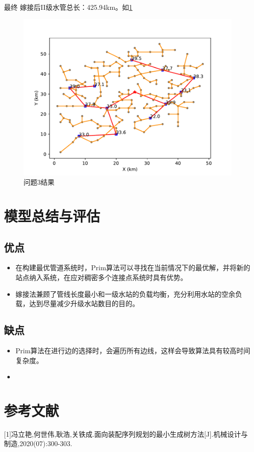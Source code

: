 \documentclass{cumcmthesis}
\begin{document}
最终
嫁接后II级水管总长：425.94km。如\cref{fig:pipline_graft_cut_9}
\begin{figure}[!h]
  \centering
  \includegraphics[width=.9\textwidth]{figure/pipline_graft_cut_9.pdf}
  \caption{问题3结果}
  \label{fig:pipline_graft_cut_9}
\end{figure}

\newpage

\section{模型总结与评估}
\subsection{优点}
\begin{itemize}
\item 在构建最优管道系统时，Prim算法可以寻找在当前情况下的最优解，并将新的站点纳入系统，在应对稠密多个连接点系统时具有优势。
\item 嫁接法兼顾了管线长度最小和一级水站的负载均衡，充分利用水站的空余负载，达到尽量减少升级水站数目的目的。
\end{itemize}
\subsection{缺点}
\begin{itemize}
\item Prim算法在进行边的选择时，会遍历所有边线，这样会导致算法具有较高时间复杂度。
\item

\end{itemize}
\section{参考文献}
  [1]冯立艳,何世伟,耿浩,关铁成.面向装配序列规划的最小生成树方法[J].机械设计与制造,2020(07):300-303.
\end{document}
